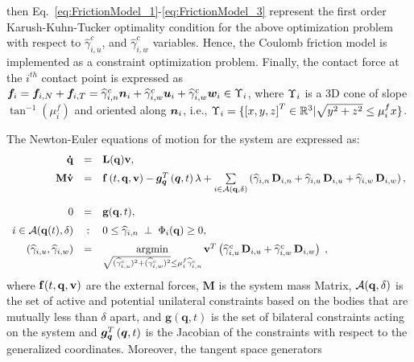 then Eq.~\ref{eq:FrictionModel_1}-\ref{eq:FrictionModel_3} represent the first order Karush-Kuhn-Tucker optimality condition for the above optimization problem with respect to $\widehat{\gamma}^c_{i,u}$, and $\widehat{\gamma}^c_{i,w}$ variables. Hence, the Coulomb friction model is implemented as a constraint optimization problem. Finally, the contact force at the $i^{th}$ contact point is expressed as $\boldsymbol{f}_i=\boldsymbol{f}_{i,N}+\boldsymbol{f}_{i,T}=\widehat{\gamma}^c_{i,n}\boldsymbol{n}_i+\widehat{\gamma}^c_{i,w}\boldsymbol{u}_i+\widehat{\gamma}^c_{i,w}\boldsymbol{w}_i \in {\Upsilon}_i$,  where ${\Upsilon}_i$ is a 3D cone of slope $\tan^{-1}(\mu^f_{i})$ and oriented along $\boldsymbol{n}_i$, i.e., ${\Upsilon}_i=\{\left[x,y,z\right]^T \in \mathbb{R}^3 | \sqrt{y^2+z^2} \leq \mu^f_{i} x\}$.


The Newton-Euler equations of motion for the system \cite{StTr95} are expressed as:
\begin{equation}
\label{eq:Newton_Euler}
\begin{gathered}
\begin{array}{rcl}
{\mathbf{\dot q}}   & = &  {\bf L}({\mathbf{q}}){\bf v} \vspace{0.2cm},  \\ 
{\mathbf{M}} {\mathbf{\dot v}} & = &{\mathbf{f}}\left( {t,  {\bf q} , {\bf v} } \right) -\vect{g}_{\vect{q}}^T\left(\vect{q},t\right)\lambda  + \vspace{0.2cm} \sum\limits_{i\in \cA({\bf q},\delta)} \left( \hatGN{i} \Pn{i} + \hatGU{i} \Ptu{i}  + \hatGW{i} \Ptw{i}  \right) \vspace{0.2cm}, \\
0 & = & {\bf g}({\bf q},t)\vspace{0.2cm}, \\ 
i \in \cA({\bf q}(t),\delta)  &:&  0 \le \hatGN{i} \; \perp \; \Phi_{i}({\bf q}) \geq 0 \vspace{0.2cm}, \\
\left(\hatGU{i}, \hatGW{i} \right)  &=&  \mathop {\mbox{argmin}}\limits_{\sqrt{(\widehat{\gamma}^c_{i,u})^2+(\widehat{\gamma}^c_{i,w})^2} \leq \mu^f_{i} \widehat{\gamma}^c_{i,n}} {\bf v}^T \left( \widehat{\gamma}^c_{i,u} \Ptu{i} + \widehat{\gamma}^c_{i,w} \Ptw{i} \right) \;,
\end{array}
\end{gathered} 
\end{equation}
where  $\mathbf{f}(t,  {\bf q} , {\bf v} ) $ are the external forces, $\textbf{M}$ is the system mass Matrix, ${\cal A}({\bf q},\delta)$  is the set of active and potential unilateral constraints based on the bodies that are mutually less than $\delta$ apart, and $\textbf{g}(\textbf{q},t)$ is the set of bilateral constraints acting on the system and $\boldsymbol{g}_{\boldsymbol{q}}^T\left(\boldsymbol{q},t\right)$ is the Jacobian of the constraints with respect to the generalized coordinates. Moreover, the tangent space generators 
